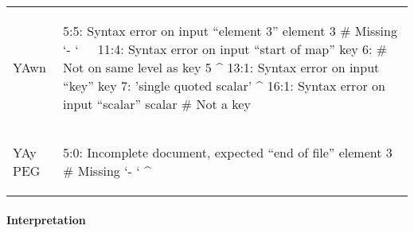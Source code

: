 \begin{table}[H]
\begin{tabular}{lp{}}
    \vspace{0cm}
    YAwn &
    \vspace{-0.36cm}
    \begin{textcode}
      5:5: Syntax error on input “element 3”
               element 3 # Missing `- `
               ^^^^^^^^^
      11:4: Syntax error on input “start of map”
               key 6: # Not on same level as key 5
               ^
      13:1: Syntax error on input “key”
            key 7: 'single quoted scalar'
            ^
      16:1: Syntax error on input “scalar”
            scalar # Not a key
            ^^^^^^
    \end{textcode}
    \\

    \vspace{0cm}
    YAy PEG &
    \vspace{-0.36cm}
    \begin{textcode}
      5:0: Incomplete document, expected “end of file”
               element 3 # Missing `- `
           ^
    \end{textcode}
    \\

    \bottomrule

  \end{tabular}

\end{table}

\paragraph{Interpretation}

